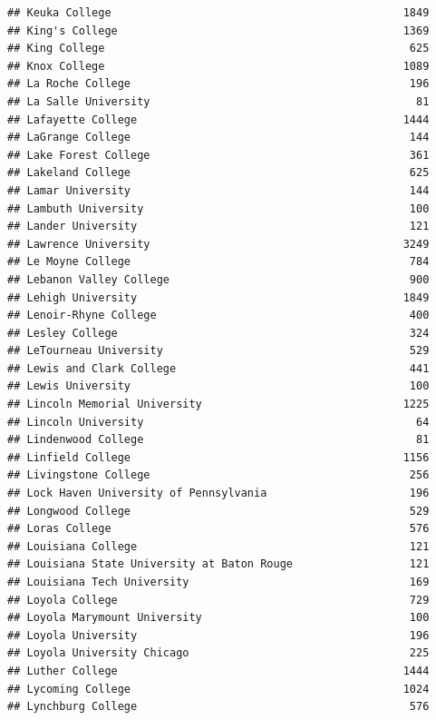 \documentclass[
]{article}
\begin{document}
\begin{verbatim}
## Keuka College                                             1849
## King's College                                            1369
## King College                                               625
## Knox College                                              1089
## La Roche College                                           196
## La Salle University                                         81
## Lafayette College                                         1444
## LaGrange College                                           144
## Lake Forest College                                        361
## Lakeland College                                           625
## Lamar University                                           144
## Lambuth University                                         100
## Lander University                                          121
## Lawrence University                                       3249
## Le Moyne College                                           784
## Lebanon Valley College                                     900
## Lehigh University                                         1849
## Lenoir-Rhyne College                                       400
## Lesley College                                             324
## LeTourneau University                                      529
## Lewis and Clark College                                    441
## Lewis University                                           100
## Lincoln Memorial University                               1225
## Lincoln University                                          64
## Lindenwood College                                          81
## Linfield College                                          1156
## Livingstone College                                        256
## Lock Haven University of Pennsylvania                      196
## Longwood College                                           529
## Loras College                                              576
## Louisiana College                                          121
## Louisiana State University at Baton Rouge                  121
## Louisiana Tech University                                  169
## Loyola College                                             729
## Loyola Marymount University                                100
## Loyola University                                          196
## Loyola University Chicago                                  225
## Luther College                                            1444
## Lycoming College                                          1024
## Lynchburg College                                          576

\end{verbatim}
\end{document}
